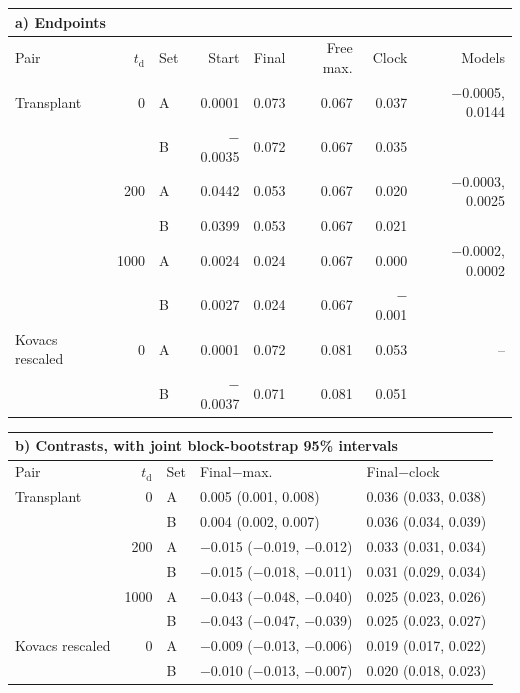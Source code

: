 \begin{tabular}{lrlrrrrr}
\multicolumn{8}{l}{a) Endpoints}\\
\toprule
Pair & $t_{\mathrm{d}}$ & Set & Start & Final & Free max. & Clock & Models\\
\midrule
Transplant & 0 & A & 0.0001 & 0.073 & 0.067 & 0.037 & $-$0.0005, 0.0144\\
 &  & B & $-$0.0035 & 0.072 & 0.067 & 0.035 & \\
 & 200 & A & 0.0442 & 0.053 & 0.067 & 0.020 & $-$0.0003, 0.0025\\
 &  & B & 0.0399 & 0.053 & 0.067 & 0.021 & \\
 & 1000 & A & 0.0024 & 0.024 & 0.067 & 0.000 & $-$0.0002, 0.0002\\
 &  & B & 0.0027 & 0.024 & 0.067 & $-$0.001 & \\
Kovacs rescaled & 0 & A & 0.0001 & 0.072 & 0.081 & 0.053 & --\\
 &  & B & $-$0.0037 & 0.071 & 0.081 & 0.051 & \\
\bottomrule
\end{tabular}

\vspace{8pt}

\begin{tabular}{lrlll}
\multicolumn{5}{l}{b) Contrasts, with joint block-bootstrap 95\% intervals}\\
\toprule
Pair & $t_{\mathrm{d}}$ & Set & Final$-$max. & Final$-$clock\\
\midrule
Transplant & 0 & A & 0.005 (0.001, 0.008) & 0.036 (0.033, 0.038)\\
 &  & B & 0.004 (0.002, 0.007) & 0.036 (0.034, 0.039)\\
 & 200 & A & $-$0.015 ($-$0.019, $-$0.012) & 0.033 (0.031, 0.034)\\
 &  & B & $-$0.015 ($-$0.018, $-$0.011) & 0.031 (0.029, 0.034)\\
 & 1000 & A & $-$0.043 ($-$0.048, $-$0.040) & 0.025 (0.023, 0.026)\\
 &  & B & $-$0.043 ($-$0.047, $-$0.039) & 0.025 (0.023, 0.027)\\
Kovacs rescaled & 0 & A & $-$0.009 ($-$0.013, $-$0.006) & 0.019 (0.017, 0.022)\\
 &  & B & $-$0.010 ($-$0.013, $-$0.007) & 0.020 (0.018, 0.023)\\
\bottomrule
\end{tabular}
